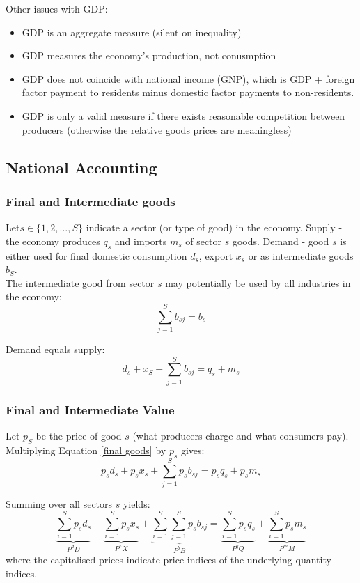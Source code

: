 \documentclass[11pt]{article}
\begin{document}
Other issues with GDP:
\begin{itemize} \setcounter{enumi}{4}
    \item GDP is an aggregate measure (silent on inequality)
    \item GDP measures the economy's production, not conusmption
    \item GDP does not coincide with national income (GNP), which is GDP + foreign factor payment to residents minus domestic factor payments to non-residents.
    \item GDP is only a valid measure if there exists reasonable competition between producers (otherwise the relative goods prices are meaningless)
\end{itemize}
\subsection{National Accounting}
\subsubsection{Final and Intermediate goods}

Let$s\in \{ 1,2,\ldots, S\}$ indicate a sector (or type of good) in the economy. Supply - the economy produces $q_s$ and imports $m_s$ of sector $s$ goods. Demand - good $s$ is either used for final domestic consumption $d_s$, export $x_s$ or as intermediate goods $b_S$.\\
The intermediate good from sector $s$ may potentially be used by all industries in the economy:
\[ \sum_{j=1}^S b_{sj} = b_s\]

\begin{shaded}
    Demand equals supply:
    \begin{equation}
    \label{final goods}
        d_s +x_S + \sum_{j=1}^S b_{sj} = q_s + m_s
    \end{equation}

\end{shaded}

\subsubsection{Final and Intermediate Value}

Let $p_S$ be the price of good $s$ (what producers charge and what consumers pay). Multiplying Equation \eqref{final goods} by $p_s$ gives:
\[p_sd_s + p_s x_s +\sum_{j=1}^S p_s b_{sj} = p_sq_s + p_sm_s\]

\begin{shaded}
    Summing over all sectors $s$ yields:
    \begin{equation}
        \underbrace{\sum_{i=1}^S p_s d_s}_{P^d D} + \underbrace{\sum_{i=1}^S p_s x_s}_{P^x X} + \underbrace{\sum_{i=1}^S \sum_{j=1}^S p_s b_{sj}}_{P^b B} = \underbrace{\sum_{i=1}^S p_s q_s}_{P^q Q} + \underbrace{\sum_{i=1}^S p_s m_s}_{P^m M}
    \end{equation}
    where the capitalised prices indicate price indices of the underlying quantity indices.
\end{shaded}
\end{document}
